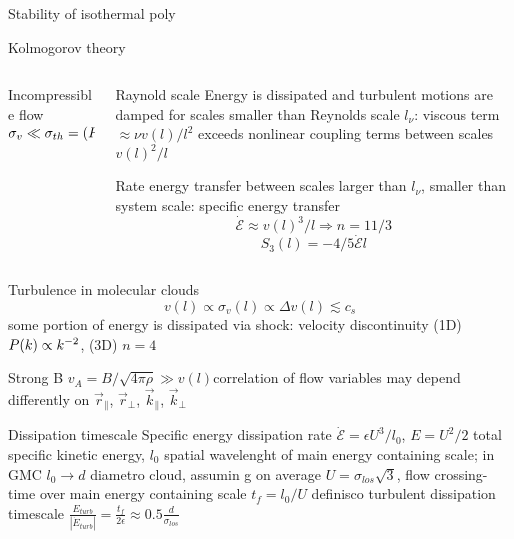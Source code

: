 \begin{frame}{Stability of isothermal poly}
\begin{frame}{Kolmogorov theory}
\begin{columns}[T]\begin{column}{0.5\textwidth}
\begin{block}{Incompressible flow}
$\sigma_v\ll\sigma_{th}=(P_{th}/\rho)^{1/2}$
\end{block}
\end{column}\begin{column}{0.5\textwidth}
\begin{block}{Raynold scale}
Energy is dissipated and turbulent motions are damped for scales smaller than Reynolds scale $l_{\nu}$: viscous term $\approx\nu v(l)/l^2$ exceeds nonlinear coupling terms between scales $v(l)^2/l$
\end{block}
\begin{block}{Rate energy transfer between scales}
larger than $l_{\nu}$, smaller than system scale: specific energy transfer
\[\dot{\mathcal{E}}\approx v(l)^3/l\Rightarrow n=11/3\]
\[S_3(l)=-4/5\dot{\mathcal{E}}l\]
\end{block}
\end{column}\end{columns}
\end{frame}

\begin{frame}{Turbulence in molecular clouds}
\[v(l)\propto\sigma_v(l)\propto\Delta  v(l)\lesssim c_s\]
some portion of energy is dissipated via shock: velocity discontinuity (1D) $P(k)\propto k^{-2}$, (3D) $n=4$
\begin{block}{Strong B}
$v_A=B/\sqrt{4\pi\rho}\gg v(l)$correlation of flow variables may depend differently on $\vec{r}_{\parallel}$, $\vec{r}_{\perp}$, $\vec{k}_{\parallel}$, $\vec{k}_{\perp}$
\end{block}
\begin{block}{Dissipation timescale}
Specific energy dissipation rate $\dot{\mathcal{E}}=\epsilon U^3/l_0$, $E=U^2/2$ total specific kinetic energy, $l_0$ spatial wavelenght of main energy containing scale; in GMC $l_0\to d$ diametro cloud, assumin g on average $U=\sigma_{los}\sqrt{3}$, flow crossing-time over main energy containing scale $t_f=l_0/U$ definisco turbulent dissipation timescale $\frac{E_{turb}}{|\dot{E}_{turb}|}=\frac{t_f}{2\epsilon}\approx0.5\frac{d}{\sigma_{los}}$
\end{block}
\end{frame}


\end{frame}
